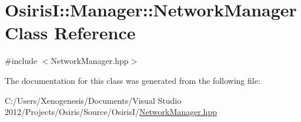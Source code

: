 \hypertarget{class_osiris_i_1_1_manager_1_1_network_manager}{\section{Osiris\-I\-:\-:Manager\-:\-:Network\-Manager Class Reference}
\label{class_osiris_i_1_1_manager_1_1_network_manager}
}


{\ttfamily \#include $<$Network\-Manager.\-hpp$>$}



The documentation for this class was generated from the following file\-:\begin{DoxyCompactItemize}
\item 
C\-:/\-Users/\-Xenogenesis/\-Documents/\-Visual Studio 2012/\-Projects/\-Osiris/\-Source/\-Osiris\-I/\hyperlink{_network_manager_8hpp}{Network\-Manager.\-hpp}\end{DoxyCompactItemize}
